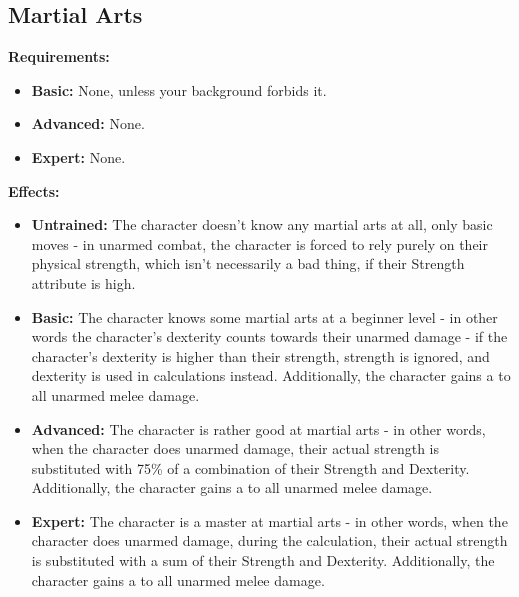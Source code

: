 \subsection{Martial Arts}
\begin{table}[!ht]
\centering
{}
\end{table}
\textbf{Requirements:}
\begin{itemize}
	\item \textbf{Basic:} None, unless your background forbids it.
	\item \textbf{Advanced:} None.
	\item \textbf{Expert:} None.
\end{itemize}
\textbf{Effects:}
\begin{itemize}
	\item \textbf{Untrained:} The character doesn't know any martial arts at all, only basic moves  - in unarmed combat, the character is forced to rely purely on their physical strength, which isn't necessarily a bad thing, if their Strength attribute is high.
	\item \textbf{Basic:} The character knows some martial arts at a beginner level - in other words the character's dexterity counts towards their unarmed damage - if the character's dexterity is higher than their strength, strength is ignored, and dexterity is used in calculations instead. Additionally, the character gains a  to all unarmed melee damage.
	\item \textbf{Advanced:} The character is rather good at martial arts - in other words, when the character does unarmed damage, their actual strength is substituted with 75\% of a combination of their Strength and Dexterity. Additionally, the character gains a  to all unarmed melee damage.
	\item \textbf{Expert:} The character is a master at martial arts - in other words, when the character does unarmed damage, during the calculation, their actual strength is substituted with a sum of their Strength and Dexterity. Additionally, the character gains a  to all unarmed melee damage.
\end{itemize}\newpage
